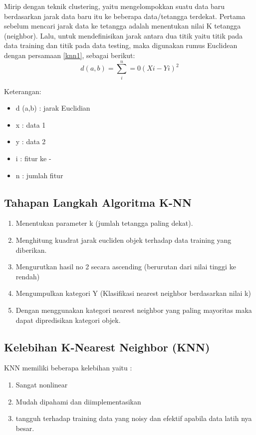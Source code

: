 Mirip dengan teknik clustering, yaitu mengelompokkan suatu data baru berdasarkan jarak data baru itu ke beberapa data/tetangga terdekat. Pertama sebelum mencari jarak data ke tetangga adalah menentukan nilai K tetangga (neighbor). Lalu, untuk mendefinisikan jarak antara dua titik yaitu titik pada data training dan titik pada data testing, maka digunakan rumus Euclidean dengan persamaan \ref{knn1}, sebagai berikut:
\\
\begin{equation}
\label{knn1}
    d(a, b) =\sum^n _i=0 (Xi-Yi)^2
\end{equation}
\par Keterangan:
\begin{itemize}
    \item d (a,b) : jarak Euclidian
    \item x : data 1
    \item y : data 2
    \item i : fitur ke -
    \item n : jumlah fitur
\end{itemize}

\subsection{Tahapan Langkah Algoritma K-NN}
\begin{enumerate}
    \item Menentukan parameter k (jumlah tetangga paling dekat).
    \item Menghitung kuadrat jarak eucliden objek terhadap data training yang diberikan.
    \item Mengurutkan hasil no 2 secara ascending (berurutan dari nilai tinggi ke rendah)
    \item Mengumpulkan kategori Y (Klasifikasi nearest neighbor berdasarkan nilai k)
    \item Dengan menggunakan kategori nearest neighbor yang paling mayoritas maka dapat dipredisikan kategori objek.
\end{enumerate}
\subsection{Kelebihan K-Nearest Neighbor (KNN)}
KNN memiliki beberapa kelebihan yaitu :
\begin{enumerate}
    \item Sangat nonlinear
    \item Mudah dipahami dan diimplementasikan
    \item tangguh terhadap training data yang noisy dan efektif apabila data latih nya besar.
\end{enumerate}

